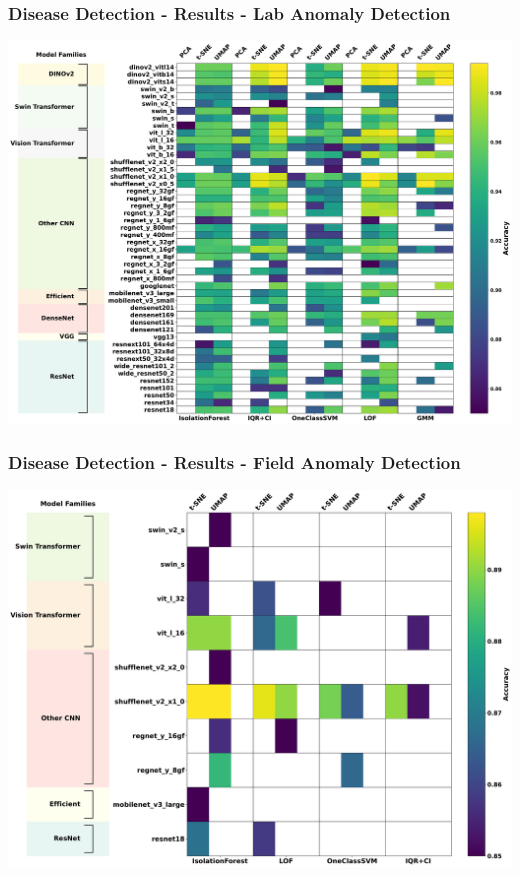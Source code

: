 \documentclass[aspectratio=43]{beamer}
\begin{document}
\begin{frame}
    \frametitle{\small Disease Detection - Results - Lab Anomaly Detection}
        \centering
        \includegraphics[width=0.9\linewidth]{Imgs/Plant_Village_Dataset_Anomaly_Detection_Performance.pdf}
\end{frame}

\begin{frame}
    \frametitle{\small Disease Detection - Results - Field Anomaly Detection}
        \centering
        \includegraphics[width=0.9\linewidth]{Imgs/Plant_Pathology_Dataset_Anomaly_Detection_Performance.pdf}
\end{frame}
\end{document}
